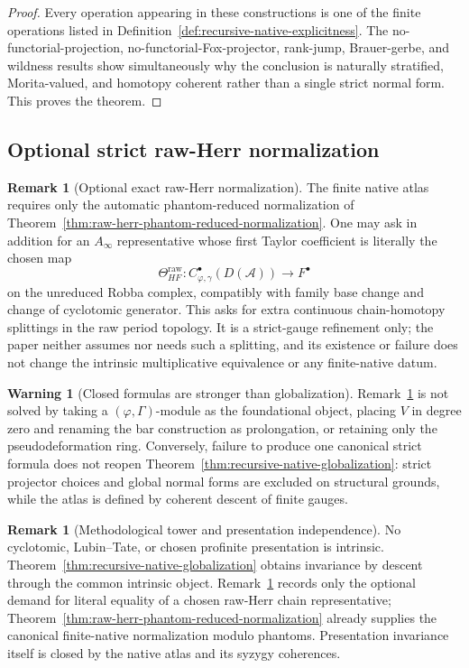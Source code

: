 \documentclass[11pt]{article}
\theoremstyle{definition}
\newtheorem{remark}[theorem]{Remark}
\newtheorem{warning}[theorem]{Warning}
\begin{document}
\begin{proof}
Every operation appearing in these constructions is one of the finite operations listed in Definition~\ref{def:recursive-native-explicitness}.  The no-functorial-projection, no-functorial-Fox-projector, rank-jump, Brauer-gerbe, and wildness results show simultaneously why the conclusion is naturally stratified, Morita-valued, and homotopy coherent rather than a single strict normal form.  This proves the theorem.
\end{proof}

\subsection{Optional strict raw-Herr normalization}

\begin{remark}[Optional exact raw-Herr normalization]\label{rem:optional-exact-raw-herr-normalization}
The finite native atlas requires only the automatic phantom-reduced
normalization of Theorem~\ref{thm:raw-herr-phantom-reduced-normalization}.
One may ask in addition for an $A_\infty$ representative whose first Taylor
coefficient is literally the chosen map
\[
 \Theta_{HF}^{\mathrm{raw}}:
 C^\bullet_{\varphi,\gamma}(D(\mathcal A))\longrightarrow F^\bullet
\]
on the unreduced Robba complex, compatibly with family base change and change of
cyclotomic generator.  This asks for extra continuous chain-homotopy splittings
in the raw period topology.  It is a strict-gauge refinement only; the paper
neither assumes nor needs such a splitting, and its existence or failure does
not change the intrinsic multiplicative equivalence or any finite-native datum.
\end{remark}

\begin{warning}[Closed formulas are stronger than globalization]\label{warn:no-tautological-chart}
Remark~\ref{rem:optional-exact-raw-herr-normalization} is not solved by taking a $(\varphi,\Gamma)$-module as the foundational object, placing $V$ in degree zero and renaming the bar construction as prolongation, or retaining only the pseudodeformation ring.  Conversely, failure to produce one canonical strict formula does not reopen Theorem~\ref{thm:recursive-native-globalization}: strict projector choices and global normal forms are excluded on structural grounds, while the atlas is defined by coherent descent of finite gauges.
\end{warning}

\begin{remark}[Methodological tower and presentation independence]\label{rem:methodological-tower-free}
No cyclotomic, Lubin--Tate, or chosen profinite presentation is intrinsic.  Theorem~\ref{thm:recursive-native-globalization} obtains invariance by descent through the common intrinsic object.  Remark~\ref{rem:optional-exact-raw-herr-normalization} records only the optional demand for literal equality of a chosen raw-Herr chain representative; Theorem~\ref{thm:raw-herr-phantom-reduced-normalization} already supplies the canonical finite-native normalization modulo phantoms.  Presentation invariance itself is closed by the native atlas and its syzygy coherences.
\end{remark}
\end{document}
